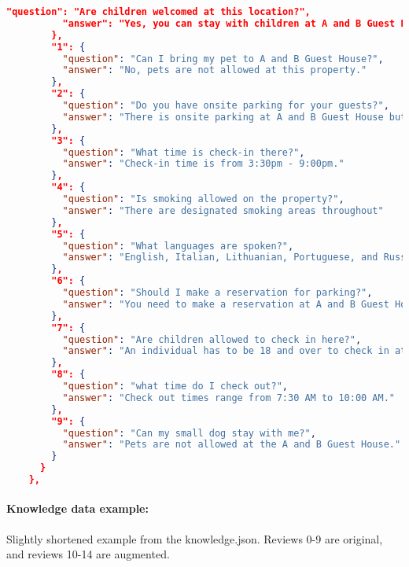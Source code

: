 \begin{lstlisting}[language=json,basicstyle=\scriptsize,columns=flexible]
          "question": "Are children welcomed at this location?",
          "answer": "Yes, you can stay with children at A and B Guest House."
        },
        "1": {
          "question": "Can I bring my pet to A and B Guest House?",
          "answer": "No, pets are not allowed at this property."
        },
        "2": {
          "question": "Do you have onsite parking for your guests?",
          "answer": "There is onsite parking at A and B Guest House but it costs extra."
        },
        "3": {
          "question": "What time is check-in there?",
          "answer": "Check-in time is from 3:30pm - 9:00pm."
        },
        "4": {
          "question": "Is smoking allowed on the property?",
          "answer": "There are designated smoking areas throughout"
        },
        "5": {
          "question": "What languages are spoken?",
          "answer": "English, Italian, Lithuanian, Portuguese, and Russian are spoken here."
        },
        "6": {
          "question": "Should I make a reservation for parking?",
          "answer": "You need to make a reservation at A and B Guest House for parking."
        },
        "7": {
          "question": "Are children allowed to check in here?",
          "answer": "An individual has to be 18 and over to check in at A and B Guest House."
        },
        "8": {
          "question": "what time do I check out?",
          "answer": "Check out times range from 7:30 AM to 10:00 AM."
        },
        "9": {
          "question": "Can my small dog stay with me?",
          "answer": "Pets are not allowed at the A and B Guest House."
        }
      }
    },
\end{lstlisting}
\paragraph{Knowledge data example:}\label{knowledge_example} Slightly shortened example from the knowledge.json. Reviews 0-9 are original, and reviews 10-14 are augmented.